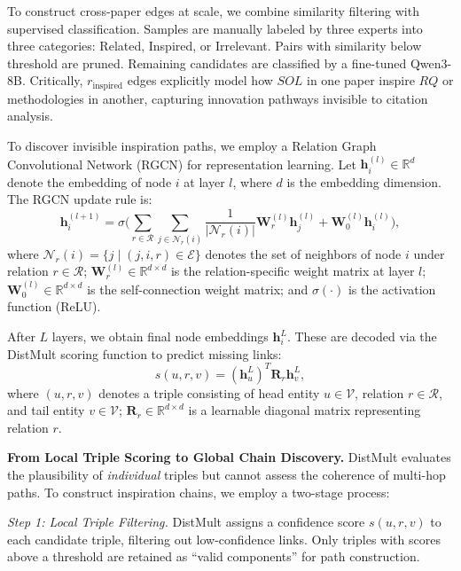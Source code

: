\documentclass[runningheads]{llncs}
\begin{document}
To construct cross-paper edges at scale, we combine similarity filtering with supervised classification. Samples are manually labeled by three experts into three categories: Related, Inspired, or Irrelevant. Pairs with similarity below threshold are pruned. Remaining candidates are classified by a fine-tuned Qwen3-8B. Critically, $r_{\text{inspired}}$ edges explicitly model how $SOL$ in one paper inspire $RQ$ or methodologies in another, capturing innovation pathways invisible to citation analysis.

To discover invisible inspiration paths, we employ a Relation Graph Convolutional Network (RGCN) for representation learning. Let $\mathbf{h}_i^{(l)} \in \mathbb{R}^d$ denote the embedding of node $i$ at layer $l$, where $d$ is the embedding dimension. The RGCN update rule is:
\begin{equation}
    \mathbf{h}_i^{(l+1)} = \sigma \Bigg( \sum_{r \in \mathcal{R}} \sum_{j \in \mathcal{N}_r(i)} \frac{1}{|\mathcal{N}_r(i)|} \mathbf{W}_r^{(l)} \mathbf{h}_j^{(l)} + \mathbf{W}_0^{(l)} \mathbf{h}_i^{(l)} \Bigg),
\end{equation}
where $\mathcal{N}_r(i) = \{j \mid (j, i, r) \in \mathcal{E}\}$ denotes the set of neighbors of node $i$ under relation $r \in \mathcal{R}$; $\mathbf{W}_r^{(l)} \in \mathbb{R}^{d \times d}$ is the relation-specific weight matrix at layer $l$; $\mathbf{W}_0^{(l)} \in \mathbb{R}^{d \times d}$ is the self-connection weight matrix; and $\sigma(\cdot)$ is the activation function (ReLU).

After $L$ layers, we obtain final node embeddings $\mathbf{h}_i^L$. These are decoded via the DistMult scoring function to predict missing links:
\begin{equation}
    s(u, r, v) = (\mathbf{h}_u^L)^T \mathbf{R}_r \mathbf{h}_v^L,
\end{equation}
where $(u, r, v)$ denotes a triple consisting of head entity $u \in \mathcal{V}$, relation $r \in \mathcal{R}$, and tail entity $v \in \mathcal{V}$; $\mathbf{R}_r \in \mathbb{R}^{d \times d}$ is a learnable diagonal matrix representing relation $r$.

\textbf{From Local Triple Scoring to Global Chain Discovery.} DistMult evaluates the plausibility of \textit{individual} triples but cannot assess the coherence of multi-hop paths. To construct inspiration chains, we employ a two-stage process:

\textit{Step 1: Local Triple Filtering.} DistMult assigns a confidence score $s(u, r, v)$ to each candidate triple, filtering out low-confidence links. Only triples with scores above a threshold are retained as ``valid components'' for path construction.
\end{document}
